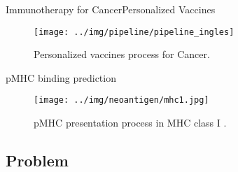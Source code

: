 \documentclass[10pt]{beamer}
\newcommand{\1}{
	\setbeamertemplate{background}{
		\texttt{[image: img/1]}
		\tikz[overlay] \fill[fill opacity=0.75,fill=white] (0,0) rectangle (-\paperwidth,\paperheight);
	}
}
\begin{document}
	\begin{frame}{Immunotherapy for Cancer}{Personalized Vaccines}	
		\begin{figure}
			\texttt{[image: ../img/pipeline/pipeline\_ingles]}
			\caption{Personalized vaccines process for Cancer.}
		\end{figure}		
	\end{frame}
	
	
	
	\begin{frame}{pMHC binding prediction}{}		
		\begin{figure}[H]
			\centering
			\texttt{[image: ../img/neoantigen/mhc1.jpg]}
			\caption{pMHC presentation process in MHC class I \cite{zhang2019application}.}
			\label{fig:mhc1}
		\end{figure}	
	\end{frame}
	
	\subsection{Problem}
	
\end{document}
